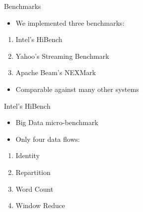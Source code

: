 \documentclass[14pt,t]{beamer}
\renewcommand{\title}[1]{
  {\LARGE #1} \vskip 0.4cm
}
\begin{document}
\begin{frame}
  \title{Benchmarks}
  \begin{itemize}
  \item We implemented three benchmarks:
  \end{itemize}
  \begin{enumerate}
  \item Intel's HiBench
  \item Yahoo's Streaming Benchmark
  \item Apache Beam's NEXMark
  \end{enumerate}
  \begin{itemize}
  \item Comparable against many other systems
  \end{itemize}
\end{frame}

\begin{frame}
  \title{Intel's HiBench\footnotemark}
  \begin{itemize}
  \item Big Data micro-benchmark
  \item Only four data flows:
  \end{itemize}
  \begin{enumerate}
  \item Identity \hfill{}
  \item Repartition \hfill{}
  \item Word Count \hfill{}
  \item Window Reduce \hfill{}
  \end{enumerate}
\end{frame}
\end{document}

